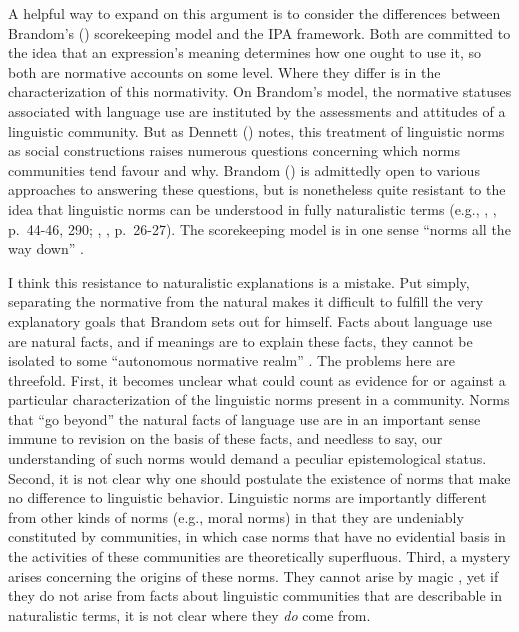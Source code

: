 A helpful way to expand on this argument is to consider the differences between Brandom's (\citeyear{Brandom:1994}) scorekeeping model and the IPA framework. Both are committed to the idea that an expression's meaning determines how one ought to use it, so both are normative accounts on some level. Where they differ is in the characterization of this normativity. On Brandom's model, the normative statuses associated with language use are instituted by the assessments and attitudes of a linguistic community. But as Dennett (\citeyear{Dennett:2010}) notes, this treatment of linguistic norms as social constructions raises numerous questions concerning which norms communities tend favour and why. Brandom (\citeyear{Brandom:2010}) is admittedly open to various approaches to answering these questions, but is nonetheless quite resistant to the idea that linguistic norms can be understood in fully naturalistic terms (e.g., \citeauthor{Brandom:1994}, \citeyear{Brandom:1994}, p.~44-46, 290; \citeauthor{Brandom:2000}, \citeyear{Brandom:2000}, p.~26-27). The scorekeeping model is in one sense ``norms all the way down'' \citep[][p. 44]{Brandom:1994}.

I think this resistance to naturalistic explanations is a mistake. Put simply, separating the normative from the natural makes it difficult to fulfill the very explanatory goals that Brandom sets out for himself. Facts about language use are natural facts, and if meanings are to explain these facts, they cannot be isolated to some ``autonomous normative realm'' \citep[][p. 133]{Horwich:2005}. The problems here are threefold. First, it becomes unclear what could count as evidence for or against a particular characterization of the linguistic norms present in a community. Norms that ``go beyond'' the natural facts of language use are in an important sense immune to revision on the basis of these facts, and needless to say, our understanding of such norms would demand a peculiar epistemological status. Second, it is not clear why one should postulate the existence of norms that make no difference to linguistic behavior. Linguistic norms are importantly different from other kinds of norms (e.g., moral norms) in that they are undeniably constituted by communities, in which case norms that have no evidential basis in the activities of these communities are theoretically superfluous. Third, a mystery arises concerning the origins of these norms. They cannot arise by magic \citep{Dennett:2010}, yet if they do not arise from facts about linguistic communities that are describable in naturalistic terms, it is not clear where they \textit{do} come from. 

